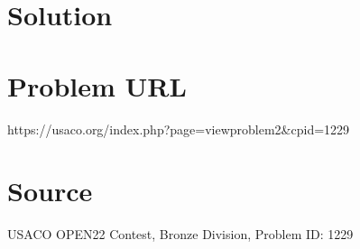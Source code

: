 \documentclass[12pt]{article}
\begin{document}
\section*{Solution}


\section*{Problem URL}
https://usaco.org/index.php?page=viewproblem2&cpid=1229

\section*{Source}
USACO OPEN22 Contest, Bronze Division, Problem ID: 1229
\end{document}
